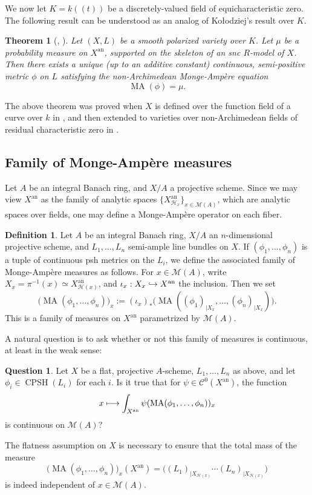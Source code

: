 \documentclass[JEP,XML,SOM,Unicode,published]{cedram}
\newcommand\mto{\mathchoice{\longmapsto}{\mapsto}{\mapsto}{\mapsto}}
\newcommand\hto{\mathrel{\lhook\joinrel\to}}
\newcommand{\lpr}{(\!(}
\newcommand{\rpr}{)\!)}
\newtheorem{theo}[equation]{Theorem}
\theoremstyle{definition}
\newtheorem{defn}[equation]{Definition}
\newtheorem{qu}[equation]{Question}
\newcommand \M {\mathscr {M}}
\newcommand{\an}{\mathrm{an}}
\DeclareMathOperator{\CPSH}{CPSH}
\DeclareMathOperator{\MA}{MA}
\begin{document}
We now let $K= k\lpr t\rpr$ be a discretely-valued field of equicharacteristic zero. The following result can be understood as an analog of Kołodziej's result over $K$.
\begin{theo}[{\cite[Th.\,A]{BFJ1}, \cite{BGJKM}}] \label{theo sol MA}
Let $(X, L)$ be a smooth polarized variety over $K$. Let $\mu$ be a probability measure on $X^{\an}$, supported on the skeleton of an snc $R$-model of $X$. Then there exists a unique (up to an additive constant) continuous, semi-positive metric $\phi$ on $L$ satisfying the non-Archimedean Monge-Ampère equation
\[
\MA(\phi) = \mu.
\]
\end{theo}
The above theorem was proved when $X$ is defined over the function field of a curve over $k$ in \cite{BFJ1}, and then extended to varieties over non-Archimedean fields of residual characteristic zero in \cite{BGJKM}.
\subsection{Family of Monge-Ampère measures} \label{sec MA family}
Let $A$ be an integral Banach ring, and $X/A$ a projective scheme. Since we may view $X^{\an}$ as the family of analytic spaces $\{ X^{\an}_{\mathscr{H}_x}
\}_{x \in \M(A)}$, which are analytic spaces over fields, one may define a Monge-Ampère operator on each fiber.
\begin{defn} Let $A$ be an integral Banach ring, $X/A$ an $n$-dimensional projective scheme, and $L_1,\dots,L_n$ semi-ample line bundles on $X$. If $(\phi_1,\dots, \phi_n)$ is a tuple of continuous psh metrics on the $L_i$, we define the associated family of Monge-Ampère measures as follows. For $x \in \M(A)$, write $X_x = \pi^{-1}(x) \simeq X^{\an}_{\mathscr{H}(x)}$, and $\iota_x: X_x \hto X^{\an}$ the inclusion. Then we set
\[
\bigl(\MA(\phi_1,\dots, \phi_n)\bigr)_x:= (\iota_x)_* \bigl(\MA((\phi_1)_{|X_x},\dots,(\phi_n)_{|X_x})\bigr).
\]
This is a family of measures on $X^{\an}$ parametrized by $\M(A)$.
\end{defn}
A natural question is to ask whether or not this family of measures is continuous, at least in the weak sense:
\begin{qu} Let $X$ be a flat, projective $A$-scheme, $L_1,\dots,L_n$ as above, and let $\phi_i \in \CPSH(L_i)$ for each $i$. Is it true that for $\psi \in \mathcal{C}^0(X^{\an})$, the function
\[
x \mto \int_{X^{\an}} \psi (\MA(\phi_1,\dots, \phi_n))_x
\]
is continuous on $\M(A)$?
\end{qu}
The flatness assumption on $X$ is necessary to ensure that the total mass of the measure
\[
\bigl(\MA(\phi_1,\dots, \phi_n)\bigr)_x (X^{\an}) = \bigl((L_1)_{| X_{\mathscr{H}(x)}} \cdots (L_n)_{| X_{\mathscr{H}(x)}}\bigr)
\]
is indeed independent of $x \in \M(A)$.
\end{document}
